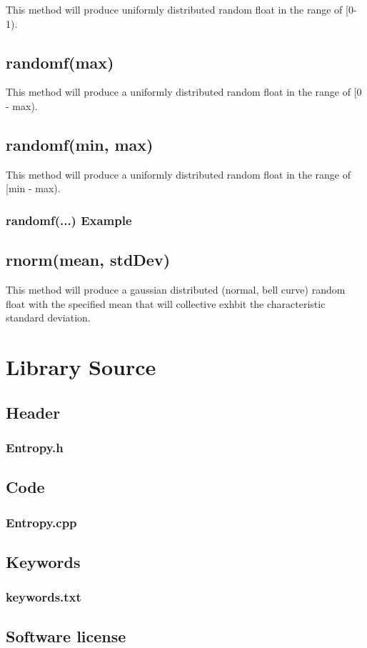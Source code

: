 \documentclass[10pt]{report}
\newcommand{\code}[2]{
 \hrulefill
 \subsection*{#1}
 
 \vspace{2em}
}
\begin{document}
This method will produce uniformly distributed random float in the range of [0-1).

\section{randomf(max)}

This method will produce a uniformly distributed random float in the range of [0 - max).

\section{randomf(min, max)}

This method will produce a uniformly distributed random float in the range of [min - max).

\code{randomf(...) Example}{randomf_example.ino}

\section{rnorm(mean, stdDev)}

This method will produce a gaussian distributed (normal, bell curve) random float with the specified mean that will 
collective exhbit the characteristic standard deviation.

\chapter{Library Source}

\section{Header}

\code{Entropy.h}{../Entropy.h}

\section{Code}

\code{Entropy.cpp}{../Entropy.cpp}

\section{Keywords}

\code{keywords.txt}{../keywords.txt}

\section{Software license}

\code{}{../gpl.txt}




\end{document}
